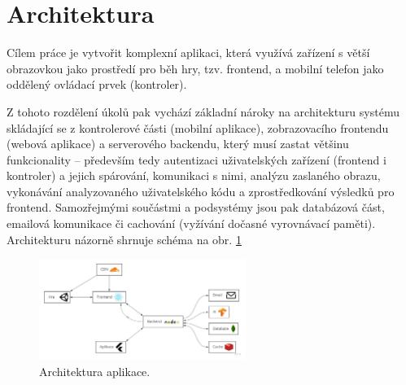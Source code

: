 \section{Architektura}

Cílem práce je vytvořit komplexní aplikaci, která využívá zařízení s větší obrazovkou jako prostředí pro běh hry, tzv. frontend, a mobilní telefon jako oddělený ovládací prvek (kontroler). \par
Z tohoto rozdělení úkolů pak vychází základní nároky na architekturu systému skládající se z kontrolerové části (mobilní aplikace), zobrazovacího frontendu (webová aplikace) a serverového backendu, který musí zastat většinu funkcionality – především tedy autentizaci uživatelských zařízení (frontend i kontroler) a jejich spárování, komunikaci s nimi, analýzu zaslaného obrazu, vykonávání analyzovaného uživatelského kódu a zprostředkování výsledků pro frontend. Samozřejmými součástmi a podsystémy jsou pak databázová část, emailová komunikace či cachování (vyžívání dočasné vyrovnávací paměti). Architekturu názorně shrnuje schéma na obr. \ref{fig:architektura}

\begin{figure}[h]
    \centering
    \includegraphics[width=0.6\textwidth]{img/architektura.jpg}
    \caption{Architektura aplikace.}
    \label{fig:architektura}
\end{figure}